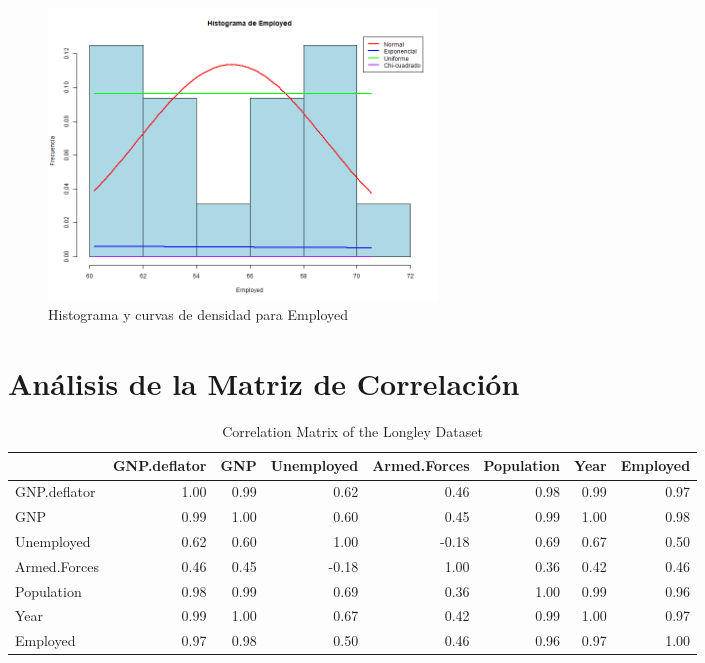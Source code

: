 \documentclass{article}
\begin{document}
\begin{figure}[H]
    \centering
    \includegraphics[width=0.5\textwidth]{HistogramasDensidad/histograma_Employed.png}
    \caption{Histograma y curvas de densidad para Employed}
    \vspace{0.5cm}
\end{figure}

\section{Análisis de la Matriz de Correlación}


\begin{table}[ht]
    \centering
    \begin{adjustbox}{max width=\textwidth}
    \begin{tabular}{lrrrrrrr}
    \hline
     & GNP.deflator & GNP & Unemployed & Armed.Forces & Population & Year & Employed \\ 
    \hline
    GNP.deflator & 1.00 & 0.99 & 0.62 & 0.46 & 0.98 & 0.99 & 0.97 \\ 
    GNP & 0.99 & 1.00 & 0.60 & 0.45 & 0.99 & 1.00 & 0.98 \\ 
    Unemployed & 0.62 & 0.60 & 1.00 & -0.18 & 0.69 & 0.67 & 0.50 \\ 
    Armed.Forces & 0.46 & 0.45 & -0.18 & 1.00 & 0.36 & 0.42 & 0.46 \\ 
    Population & 0.98 & 0.99 & 0.69 & 0.36 & 1.00 & 0.99 & 0.96 \\ 
    Year & 0.99 & 1.00 & 0.67 & 0.42 & 0.99 & 1.00 & 0.97 \\ 
    Employed & 0.97 & 0.98 & 0.50 & 0.46 & 0.96 & 0.97 & 1.00 \\ 
    \hline
    \end{tabular}
    \end{adjustbox}
    \caption{Correlation Matrix of the Longley Dataset}
    \label{tab:correlation_matrix_longley}
    \end{table}
    
\end{document}
